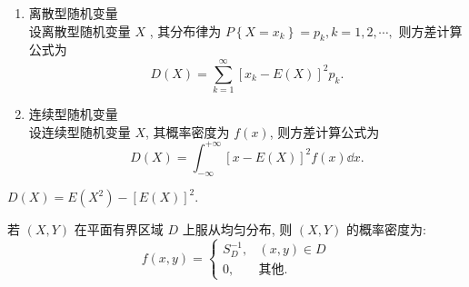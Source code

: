 \begin{enumerate}[label=(\arabic{*})]
    \item 离散型随机变量\\
    设离散型随机变量 $ X $ , 其分布律为 $P\left\{X=x_{k}\right\}=p_{k}, k=1,2, \cdots,$
    则方差计算公式为
    $$D(X)=\sum_{k=1}^{\infty}\left[x_{k}-E(X)\right]^{2} p_{k}.$$
    \item 连续型随机变量\\
    设连续型随机变量 $ X $, 其概率密度为 $ f(x) $, 则方差计算公式为
    $$D(X)=\int_{-\infty}^{+\infty}[x-E(X)]^{2} f(x) \dd  x .$$
\end{enumerate}

\begin{theorem}[方差与期望的联系]
    $D(X)=E\left(X^{2}\right)-[E(X)]^{2} .$
\end{theorem}

\begin{theorem}[二维均匀分布的随机变量的概率密度]
    若 $(X,Y)$ 在平面有界区域 $D$ 上服从均匀分布, 则 $(X,Y)$ 的概率密度为:
    $$f(x,y)=\begin{cases}
            S_D^{-1}, & (x,y)\in D   \\
            0,        & \text{其他}.
        \end{cases}$$
\end{theorem}

